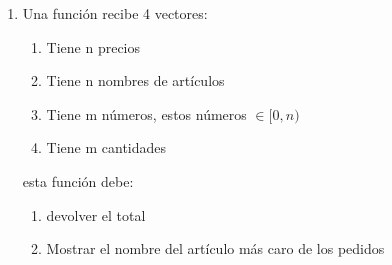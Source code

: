 \begin{enumerate}[resume]
\item Una función recibe 4 vectores: 
 \begin{enumerate}
	 \item Tiene n precios
	 \item Tiene n nombres de artículos
	 \item Tiene m números, estos números $\in [0, n)$
	 \item Tiene m cantidades	 
 \end{enumerate}
  esta función debe:
  \begin{enumerate}
	\item devolver el total
	\item Mostrar el nombre del artículo más caro de los pedidos
  \end{enumerate}

\end{enumerate}

